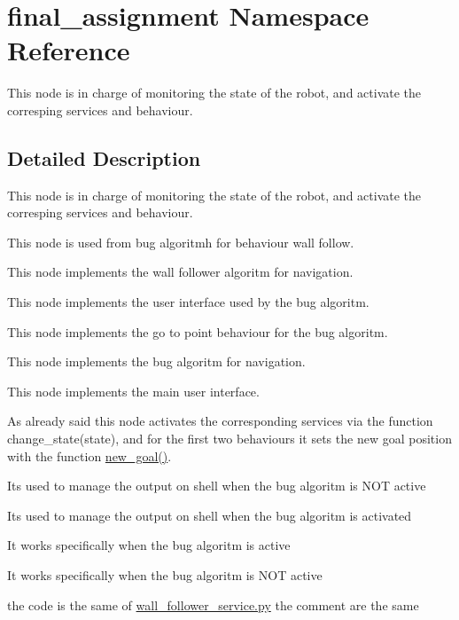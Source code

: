 \hypertarget{namespacefinal__assignment}{}\section{final\+\_\+assignment Namespace Reference}
\label{namespacefinal__assignment}


This node is in charge of monitoring the state of the robot, and activate the corresping services and behaviour.  




\subsection{Detailed Description}
This node is in charge of monitoring the state of the robot, and activate the corresping services and behaviour. 

This node is used from bug algoritmh for behaviour wall follow.

This node implements the wall follower algoritm for navigation.

This node implements the user interface used by the bug algoritm.

This node implements the go to point behaviour for the bug algoritm.

This node implements the bug algoritm for navigation.

This node implements the main user interface.

As already said this node activates the corresponding services via the function change\+\_\+state(state), and for the first two behaviours it sets the new goal position with the function \hyperlink{namespacebig__brain_a4f091a106e4ba678afd9bc2df4f2789b}{new\+\_\+goal()}.

It\textquotesingle{}s used to manage the output on shell when the bug algoritm is N\+OT active

It\textquotesingle{}s used to manage the output on shell when the bug algoritm is activated

It works specifically when the bug algoritm is active

It works specifically when the bug algoritm is N\+OT active

the code is the same of \hyperlink{wall__follower__service_8py}{wall\+\_\+follower\+\_\+service.\+py} the comment are the same 